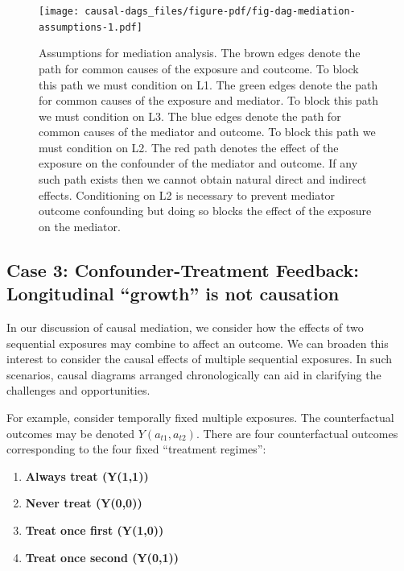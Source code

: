 \documentclass[
  singlecolumn]{report}
\begin{document}
\begin{figure}

{\centering \texttt{[image: causal-dags\_files/figure-pdf/fig-dag-mediation-assumptions-1.pdf]}

}

\caption{\label{fig-dag-mediation-assumptions}Assumptions for mediation
analysis. The brown edges denote the path for common causes of the
exposure and coutcome. To block this path we must condition on L1. The
green edges denote the path for common causes of the exposure and
mediator. To block this path we must condition on L3. The blue edges
denote the path for common causes of the mediator and outcome. To block
this path we must condition on L2. The red path denotes the effect of
the exposure on the confounder of the mediator and outcome. If any such
path exists then we cannot obtain natural direct and indirect effects.
Conditioning on L2 is necessary to prevent mediator outcome confounding
but doing so blocks the effect of the exposure on the mediator.}

\end{figure}

\hypertarget{case-3-confounder-treatment-feedback-longitudinal-growth-is-not-causation}{%
\subsection{Case 3: Confounder-Treatment Feedback: Longitudinal
``growth'' is not
causation}\label{case-3-confounder-treatment-feedback-longitudinal-growth-is-not-causation}}

In our discussion of causal mediation, we consider how the effects of
two sequential exposures may combine to affect an outcome. We can
broaden this interest to consider the causal effects of multiple
sequential exposures. In such scenarios, causal diagrams arranged
chronologically can aid in clarifying the challenges and opportunities.

For example, consider temporally fixed multiple exposures. The
counterfactual outcomes may be denoted \(Y(a_{t1} ,a_{t2})\). There are
four counterfactual outcomes corresponding to the four fixed ``treatment
regimes'':

\begin{enumerate}
\def\labelenumi{\arabic{enumi}.}
\item
  \textbf{Always treat (Y(1,1))}
\item
  \textbf{Never treat (Y(0,0))}
\item
  \textbf{Treat once first (Y(1,0))}
\item
  \textbf{Treat once second (Y(0,1))}
\end{enumerate}
\end{document}
